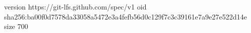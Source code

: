 version https://git-lfs.github.com/spec/v1
oid sha256:ba00f0d7578da33058a5472e3a4fefb56d0c129f7c3c39161e7a9e27e522d14e
size 700
